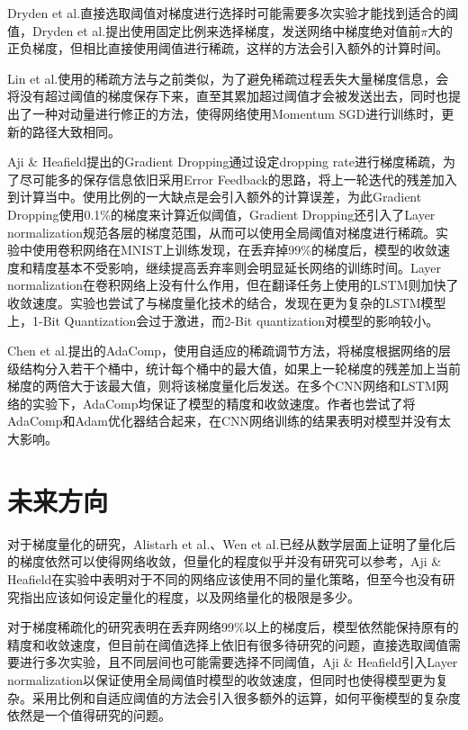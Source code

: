 \documentclass[11pt,onecolumn,letterpaper]{article}
\begin{document}
    Dryden et al.\cite{Dryden2016}直接选取阈值对梯度进行选择时可能需要多次实验才能找到适合的阈值，Dryden et al.提出使用固定比例来选择梯度，发送网络中梯度绝对值前$\pi$大的正负梯度，但相比直接使用阈值进行稀疏，这样的方法会引入额外的计算时间。

    Lin et al.\cite{Lin2017}使用的稀疏方法与之前类似，为了避免稀疏过程丢失大量梯度信息，会将没有超过阈值的梯度保存下来，直至其累加超过阈值才会被发送出去，同时也提出了一种对动量进行修正的方法，使得网络使用Momentum SGD进行训练时，更新的路径大致相同。

    Aji \& Heafield\cite{Aji2017}提出的Gradient Dropping通过设定dropping rate进行梯度稀疏，为了尽可能多的保存信息依旧采用Error Feedback的思路，将上一轮迭代的残差加入到计算当中。使用比例的一大缺点是会引入额外的计算误差，为此Gradient Dropping使用0.1\%的梯度来计算近似阈值，Gradient Dropping还引入了Layer normalization规范各层的梯度范围，从而可以使用全局阈值对梯度进行稀疏。实验中使用卷积网络在MNIST上训练发现，在丢弃掉99\%的梯度后，模型的收敛速度和精度基本不受影响，继续提高丢弃率则会明显延长网络的训练时间。Layer normalization在卷积网络上没有什么作用，但在翻译任务上使用的LSTM则加快了收敛速度。实验也尝试了与梯度量化技术的结合，发现在更为复杂的LSTM模型上，1-Bit Quantization会过于激进，而2-Bit quantization对模型的影响较小。

    Chen et al.\cite{Chen}提出的AdaComp，使用自适应的稀疏调节方法，将梯度根据网络的层级结构分入若干个桶中，统计每个桶中的最大值，如果上一轮梯度的残差加上当前梯度的两倍大于该最大值，则将该梯度量化后发送。在多个CNN网络和LSTM网络的实验下，AdaComp均保证了模型的精度和收敛速度。作者也尝试了将AdaComp和Adam优化器结合起来，在CNN网络训练的结果表明对模型并没有太大影响。


    \section{未来方向}
    对于梯度量化的研究，Alistarh et al.\cite{Alistarh}、Wen et al.\cite{Wen}已经从数学层面上证明了量化后的梯度依然可以使得网络收敛，但量化的程度似乎并没有研究可以参考，Aji \& Heafield\cite{Aji2017}在实验中表明对于不同的网络应该使用不同的量化策略，但至今也没有研究指出应该如何设定量化的程度，以及网络量化的极限是多少。

    对于梯度稀疏化的研究表明在丢弃网络99\%以上的梯度后，模型依然能保持原有的精度和收敛速度，但目前在阈值选择上依旧有很多待研究的问题，直接选取阈值需要进行多次实验，且不同层间也可能需要选择不同阈值，Aji \& Heafield\cite{Aji2017}引入Layer normalization以保证使用全局阈值时模型的收敛速度，但同时也使得模型更为复杂。采用比例和自适应阈值的方法会引入很多额外的运算，如何平衡模型的复杂度依然是一个值得研究的问题。


    {\small
         
        
    }
\end{document}
